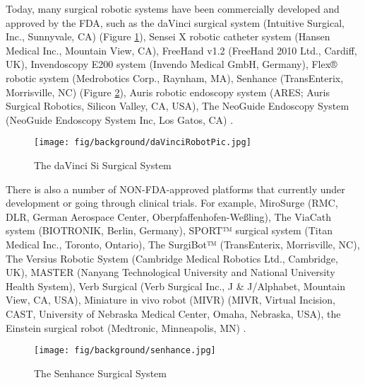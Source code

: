 Today, many surgical robotic systems have been commercially developed and approved by the FDA, such as the daVinci surgical system (Intuitive Surgical, Inc., Sunnyvale, CA) (Figure \ref{fig:daVinci}), Sensei X robotic catheter system (Hansen Medical Inc., Mountain View, CA), FreeHand v1.2 (FreeHand 2010 Ltd., Cardiff, UK), Invendoscopy E200 system (Invendo Medical GmbH, Germany), Flex® robotic system (Medrobotics Corp., Raynham, MA), Senhance (TransEnterix, Morrisville, NC) (Figure \ref{fig:Senhance}), Auris robotic endoscopy system (ARES; Auris Surgical Robotics, Silicon Valley, CA, USA), The NeoGuide Endoscopy System (NeoGuide Endoscopy System Inc, Los Gatos, CA) \cite{lanfranco_robotic_2004,peters_review_2018}.

\begin{figure}[h]
	\begin{center}
	\texttt{[image: fig/background/daVinciRobotPic.jpg]}
	\end{center}
	\vspace{-4mm}
	\caption[The daVinci Si Surgical System]
	{The daVinci Si Surgical System \cite{_intuitive_2018}}
	\label{fig:daVinci}
	\vspace{-2mm}
\end{figure}

There is also a number of NON-FDA-approved platforms that currently under development or going through clinical trials. For example, MiroSurge (RMC, DLR, German Aerospace Center, Oberpfaffenhofen-Weßling), The ViaCath system (BIOTRONIK, Berlin, Germany), SPORT™ surgical system (Titan Medical Inc., Toronto, Ontario), The SurgiBot™ (TransEnterix, Morrisville, NC), The Versius Robotic System (Cambridge Medical Robotics Ltd., Cambridge, UK), MASTER (Nanyang Technological University and National University Health System), Verb Surgical (Verb Surgical Inc., J \& J/Alphabet, Mountain View, CA, USA), Miniature in vivo robot (MIVR) (MIVR, Virtual Incision, CAST, University of Nebraska Medical Center, Omaha, Nebraska, USA), the Einstein surgical robot (Medtronic, Minneapolis, MN) \cite{peters_review_2018}.

\begin{figure}[h]
	\begin{center}
	\texttt{[image: fig/background/senhance.jpg]}
	\end{center}
	\vspace{-4mm}
	\caption[The Senhance Surgical System]
	{The Senhance Surgical System \cite{_senhance}}
	\label{fig:Senhance}
	\vspace{-2mm}
\end{figure}

